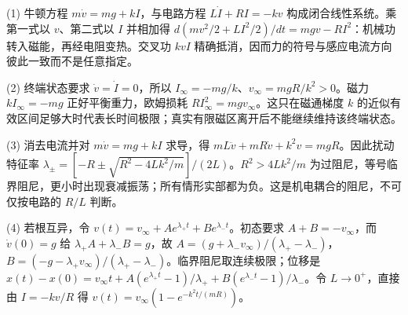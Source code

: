(1) 牛顿方程 \(m\dot v=mg+kI\)，与电路方程 \(L\dot I+RI=-kv\) 构成闭合线性系统。乘第一式以 \(v\)、第二式以 \(I\) 并相加得 \(d(mv^2/2+LI^2/2)/dt=mgv-RI^2\)：机械功转入磁能，再经电阻变热。交叉功 \(kvI\) 精确抵消，因而力的符号与感应电流方向彼此一致而不是任意指定。

(2) 终端状态要求 \(\dot v=\dot I=0\)，所以 \(I_\infty=-mg/k\)、\(v_\infty=mgR/k^2>0\)。磁力 \(kI_\infty=-mg\) 正好平衡重力，欧姆损耗 \(RI_\infty^2=mgv_\infty\)。这只在磁通梯度 \(k\) 的近似有效区间足够大时代表长时间极限；真实有限磁区离开后不能继续维持该终端状态。

(3) 消去电流并对 \(m\dot v=mg+kI\) 求导，得 \(mL\ddot v+mR\dot v+k^2v=mgR\)。因此扰动特征率 \(\lambda_\pm=[-R\pm\sqrt{R^2-4Lk^2/m}]/(2L)\)。\(R^2>4Lk^2/m\) 为过阻尼，等号临界阻尼，更小时出现衰减振荡；所有情形实部都为负。这是机电耦合的阻尼，不可仅按电路的 \(R/L\) 判断。

(4) 若根互异，令 \(v(t)=v_\infty+A e^{\lambda_+ t}+B e^{\lambda_- t}\)。初态要求 \(A+B=-v_\infty\)，而 \(\dot v(0)=g\) 给 \(\lambda_+A+\lambda_-B=g\)，故 \(A=(g+\lambda_-v_\infty)/(\lambda_+-\lambda_-)\)，\(B=(-g-\lambda_+v_\infty)/(\lambda_+-\lambda_-)\)。临界阻尼取连续极限；位移是 \(x(t)-x(0)=v_\infty t+A(e^{\lambda_+t}-1)/\lambda_++B(e^{\lambda_-t}-1)/\lambda_-\)。令 \(L\to0^+\)，直接由 \(I=-kv/R\) 得 \(v(t)=v_\infty(1-e^{-k^2t/(mR)})\)。
